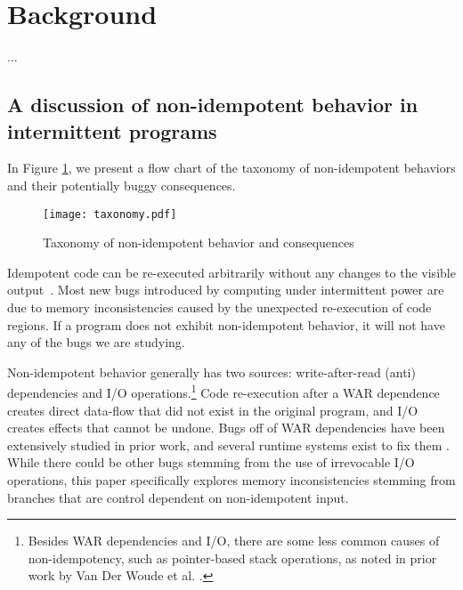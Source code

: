 \section{Background}

...

\subsection{A discussion of non-idempotent behavior in intermittent programs}

In Figure \ref{fig:tax}, we present a flow chart of the taxonomy of non-idempotent behaviors and their potentially buggy consequences. 

\begin{figure}[ht]
\centering
\texttt{[image: taxonomy.pdf]}
\caption{Taxonomy of non-idempotent behavior and consequences}
\label{fig:tax}
\end{figure}
Idempotent code can be re-executed arbitrarily without any changes to the
visible output~\cite{ratchet,dino}. Most new bugs introduced by computing under
intermittent power are due to memory inconsistencies caused by the unexpected
re-execution of code regions. If a program does not exhibit non-idempotent
behavior, it will not have any of the bugs we are studying.

Non-idempotent behavior generally has two sources: write-after-read (anti)
dependencies and I/O operations.\footnote{Besides WAR dependencies and I/O,
there are some less common causes of non-idempotency, such as pointer-based
stack operations, as noted in prior work by Van Der Woude et al.
\cite{ratchet}.} Code re-execution after a WAR dependence creates direct
data-flow that did not exist in the original program, and I/O creates effects
that cannot be undone. Bugs off of WAR dependencies have been extensively
studied in prior work, and several runtime systems exist to fix them
\cite{ratchet, alpaca, dino}. While there could be other bugs
stemming from the use of irrevocable I/O operations, this paper specifically
explores memory inconsistencies stemming from branches that are control
dependent on non-idempotent input.

